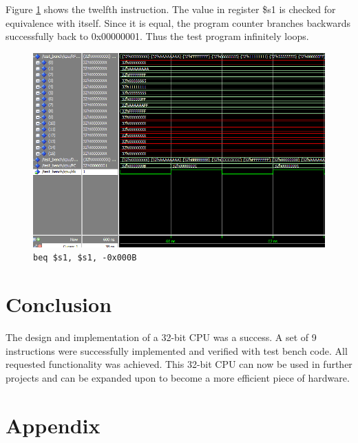 \documentclass[12pt]{article}
\begin{document}
Figure \ref{fig:12-instr} shows the twelfth instruction. The value in register \$s1 is checked for equivalence with itself. Since it is equal, the program counter branches backwards successfully back to 0x00000001. Thus the test program infinitely loops. 
\begin{figure}[H]
\centering
\includegraphics[width=\linewidth]{simulation/12-instr}
\caption{\texttt{beq \$s1, \$s1, -0x000B}}
\label{fig:12-instr}
\end{figure}


\section{Conclusion}
The design and implementation of a 32-bit CPU was a success. A set of 9 instructions were successfully implemented and verified with test bench code. All requested functionality was achieved. This 32-bit CPU can now be used in further projects and can be expanded upon to become a more efficient piece of hardware.

\section*{Appendix}

\label{code:tbCode}
\end{document}
